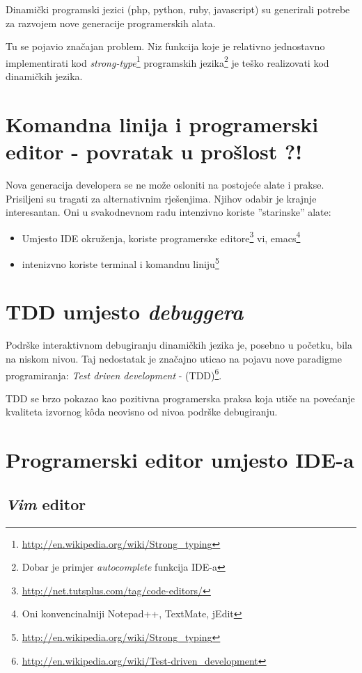 \documentclass[times, utf8, seminar]{fit}
\begin{document}
Dinamički programski jezici (php, python, ruby, javascript) su generirali potrebe za razvojem nove generacije programerskih alata. 

Tu se pojavio značajan problem. Niz funkcija koje je relativno jednostavno implementirati kod \emph{strong-type}\footnote{\url{http://en.wikipedia.org/wiki/Strong_typing}} programskih jezika\footnote{Dobar je primjer \emph{autocomplete} funkcija IDE-a} je teško realizovati kod dinamičkih jezika.

\section{Komandna linija i programerski editor - povratak u prošlost ?!}

Nova generacija developera se ne može osloniti na postojeće alate i prakse. Prisiljeni su tragati za alternativnim rješenjima. Njihov odabir je krajnje interesantan. Oni u svakodnevnom radu intenzivno koriste ''starinske'' alate:
\begin{itemize}
  \item Umjesto IDE okruženja, koriste programerske editore\footnote{\url{http://net.tutsplus.com/tag/code-editors/}} vi, emacs\footnote{Oni konvencinalniji Notepad++, TextMate, jEdit}
  \item intenizvno koriste terminal i komandnu liniju\footnote{\url{http://en.wikipedia.org/wiki/Strong_typing}} 
\end{itemize}

\section{TDD umjesto \emph{debuggera}}

Podrške interaktivnom debugiranju dinamičkih jezika je, posebno u početku, bila na niskom nivou. Taj nedostatak je značajno uticao na pojavu nove paradigme programiranja: \emph{Test driven development} - (TDD)\footnote{\url{http://en.wikipedia.org/wiki/Test-driven_development}}.

TDD se brzo pokazao kao pozitivna programerska praksa koja utiče na povećanje kvaliteta izvornog k\^oda neovisno od nivoa podrške debugiranju. 

\section{Programerski editor umjesto IDE-a}

\subsection{\emph{Vim} editor} 
\end{document}
